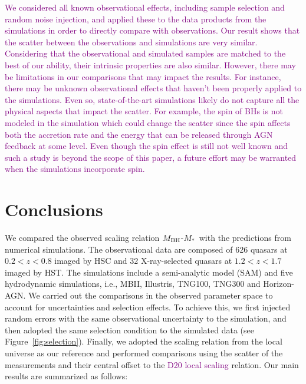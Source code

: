 \documentclass[twocolumn]{aastex631}
\newcommand{\todo}[1]{\textcolor{red}{[{\bf TODO}: #1]}}
\newcommand{\red}[1]{\textcolor{purple}{#1}}
\def\smass{{$M_*$}}
\def\mbh{$M_{\rm BH}$}
\begin{document}
\red{We considered all known observational effects, including sample selection and random noise injection, and applied these to the data products from the simulations in order to directly compare with observations. Our result shows that the scatter between the observations and simulations are very similar. Considering that the observational and simulated samples are matched to the best of our ability, their intrinsic properties are also similar. However, there may be limitations in our comparisons that may impact the results. For instance, there may be unknown observational effects that haven't been properly applied to the simulations. Even so, state-of-the-art simulations likely do not capture all the physical aspects that impact the scatter. For example, the spin of BHs is not modeled in the simulation which could change the scatter since the spin affects both the accretion rate and the energy that can be released through AGN feedback \citep{Dubois2014, 2019MNRAS.490.4133B, Habouzit2021} at some level. Even though the spin effect is still not well known and such a study is beyond the scope of this paper, a future effort may be warranted when the simulations incorporate spin.}


\section{Conclusions} \label{sec:con}
We compared the observed scaling relation \mbh-\smass\ with the predictions from numerical simulations. The observational data are composed of 626 quasars at $0.2 < z < 0.8$ imaged by HSC and 32 X-ray-selected quasars at $1.2 < z < 1.7$ imaged by HST. The simulations include a semi-analytic model (SAM) and five hydrodynamic simulations, i.e., MBII, Illustris, TNG100, TNG300 and Horizon-AGN. We carried out the comparisons in the observed parameter space to account for uncertainties and selection effects. To achieve this, we first injected random errors with the same observational uncertainty to the simulation, and then adopted the same selection condition to the simulated data (see Figure~\ref{fig:selection}). Finally, we adopted the scaling relation from the local universe as our reference and performed comparisons using the scatter of the measurements and their central offset to the \red{D20 local scaling} relation. Our main results are summarized as follows:
\end{document}
